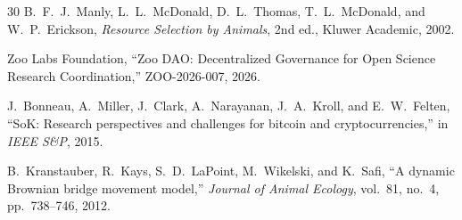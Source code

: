 \documentclass[11pt,letterpaper]{article}
\begin{document}
\begin{thebibliography}{30}
B.~F.~J.~Manly, L.~L.~McDonald, D.~L.~Thomas, T.~L.~McDonald, and W.~P.~Erickson, \emph{Resource Selection by Animals}, 2nd ed., Kluwer Academic, 2002.

Zoo Labs Foundation, ``Zoo DAO: Decentralized Governance for Open Science Research Coordination,'' ZOO-2026-007, 2026.

J.~Bonneau, A.~Miller, J.~Clark, A.~Narayanan, J.~A.~Kroll, and E.~W.~Felten, ``SoK: Research perspectives and challenges for bitcoin and cryptocurrencies,'' in \emph{IEEE S\&P}, 2015.

B.~Kranstauber, R.~Kays, S.~D.~LaPoint, M.~Wikelski, and K.~Safi, ``A dynamic Brownian bridge movement model,'' \emph{Journal of Animal Ecology}, vol.~81, no.~4, pp.~738--746, 2012.

\end{thebibliography}
\end{document}
